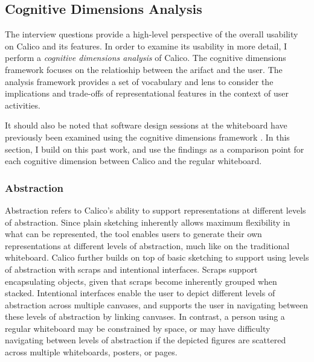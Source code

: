 \subsection{Cognitive Dimensions Analysis}

The interview questions provide a high-level perspective of the overall usability on Calico and its features. In order to examine its usability in more detail, I perform a \textit{cognitive dimensions analysis} \cite{Green96usabilityanalysis} of Calico. The cognitive dimensions framework focuses on the relatioship between the arifact and the user. The analysis framework provides a set of vocabulary and lens to consider the implications and trade-offs of representational features in the context of user activities. 

It should also be noted that software design sessions at the whiteboard have previously been examined using the cognitive dimensions framework \citep{Petre2013BookChapter}. In this section, I build on this past work, and use the findings as a comparison point for each cognitive dimension between Calico and the regular whiteboard.

\subsubsection{Abstraction}
Abstraction refers to Calico's ability to support representations at different levels of abstraction. Since plain sketching inherently allows maximum flexibility in what can be represented, the tool enables users to generate their own representations at different levels of abstraction, much like on the traditional whiteboard. Calico further builds on top of basic sketching to support  using levels of abstraction with scraps and intentional interfaces. Scraps support encapsulating objects, given that scraps become inherently grouped when stacked. Intentional interfaces enable the user to depict different levels of abstraction across multiple canvases, and supports the user in navigating between these levels of abstraction by linking canvases. In contrast, a person using a regular whiteboard may be constrained by space, or may have difficulty navigating between levels of abstraction if the depicted figures are scattered across multiple whiteboards, posters, or pages. 

